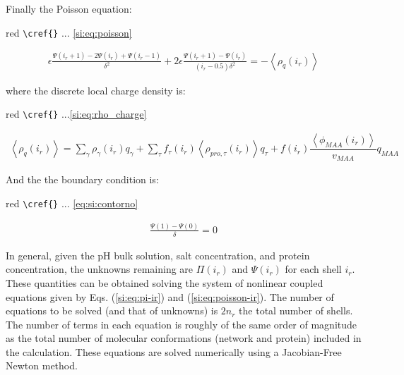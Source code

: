 \documentclass[journal=jacsat,manuscript=suppinfo]{achemso}
\begin{document}
Finally the Poisson equation:
\begin{color}{red}
	\verb|\cref{}| ... \ref{si:eq:poisson}
\end{color}

\begin{align}
	\epsilon \frac{\Psi(i_r +1) -2 \Psi(i_r) + \Psi(i_r -1)}{\delta ^2} + 2\epsilon \frac{\Psi(i_r +1) -\Psi(i_r)}{(i_r -0.5)\delta ^2}= -\left<\rho_q(i_r)\right>
	\label{si:eq:poisson-ir}
\end{align}

\noindent where the discrete local charge density is:
\begin{color}{red}
	\verb|\cref{}| ...\ref{si:eq:rho_charge}
\end{color}

\begin{align}
	\left<\rho_q(i_r)\right> = \sum_{\gamma } {\rho_\gamma(i_r) q_\gamma + \sum_\tau{f_\tau(i_r) \left<\rho_{pro,\tau}(i_r)\right> q_\tau} +  f(i_r)\dfrac{\left<\phi_{MAA}(i_r)\right>}{v_{MAA}}q_{MAA}}
\end{align}


And the the boundary condition is:
\begin{color}{red}
	\verb|\cref{}| ... \ref{eq:si:contorno}
\end{color}
\begin{align}
	\frac{\Psi(1) - \Psi(0)}{\delta} = 0
\end{align}



In general, given the pH bulk solution, salt concentration, and protein concentration, the
unknowns remaining are $\Pi(i_r)$ and $\Psi(i_r)$ for each shell $i_r$. These quantities can be obtained solving the system of nonlinear coupled equations given by Eqs. (\ref{si:eq:pi-ir}) and (\ref{si:eq:poisson-ir}). The number of equations to be solved (and that of unknowns) is $2n_r$ the total number of shells. The number of terms in each equation is roughly of the same order of magnitude as the total number of molecular conformations (network and protein) included in the calculation. These equations are solved numerically using a Jacobian-Free Newton method.
\end{document}
